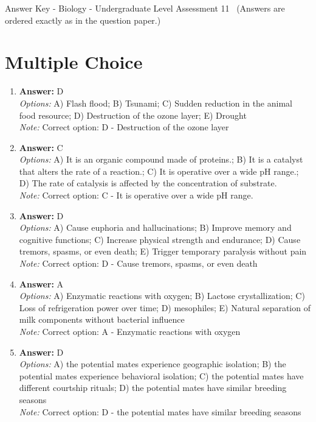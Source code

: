 \documentclass[12pt]{article}
\begin{document}
\begin{center}
Answer Key - Biology - Undergraduate Level Assessment 11 \
\small (Answers are ordered exactly as in the question paper.)
\end{center}

\section*{Multiple Choice}
\begin{enumerate}[label=\arabic*.]
\item \textbf{Answer:} D
\\ \textit{Options:} A) Flash flood; B) Tsunami; C) Sudden reduction in the animal food resource; D) Destruction of the ozone layer; E) Drought
\\ \textit{Note:} Correct option: D - Destruction of the ozone layer
\item \textbf{Answer:} C
\\ \textit{Options:} A) It is an organic compound made of proteins.; B) It is a catalyst that alters the rate of a reaction.; C) It is operative over a wide pH range.; D) The rate of catalysis is affected by the concentration of substrate.
\\ \textit{Note:} Correct option: C - It is operative over a wide pH range.
\item \textbf{Answer:} D
\\ \textit{Options:} A) Cause euphoria and hallucinations; B) Improve memory and cognitive functions; C) Increase physical strength and endurance; D) Cause tremors, spasms, or even death; E) Trigger temporary paralysis without pain
\\ \textit{Note:} Correct option: D - Cause tremors, spasms, or even death
\item \textbf{Answer:} A
\\ \textit{Options:} A) Enzymatic reactions with oxygen; B) Lactose crystallization; C) Loss of refrigeration power over time; D) mesophiles; E) Natural separation of milk components without bacterial influence
\\ \textit{Note:} Correct option: A - Enzymatic reactions with oxygen
\item \textbf{Answer:} D
\\ \textit{Options:} A) the potential mates experience geographic isolation; B) the potential mates experience behavioral isolation; C) the potential mates have different courtship rituals; D) the potential mates have similar breeding seasons
\\ \textit{Note:} Correct option: D - the potential mates have similar breeding seasons
\end{enumerate}
\end{document}
